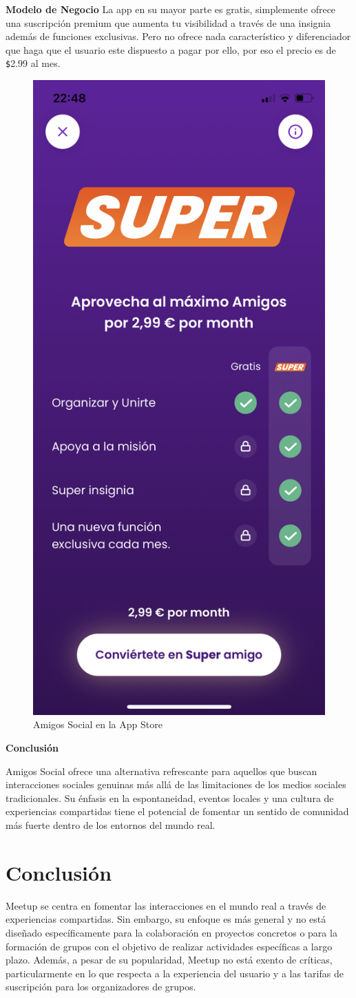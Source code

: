 \begin{itemize}
\textbf{Modelo de Negocio}
La app en su mayor parte es gratis, simplemente ofrece una suscripción premium que aumenta tu visibilidad a través de una insignia además de funciones exclusivas.
Pero no ofrece nada característico y diferenciador que haga que el usuario este dispuesto a pagar por ello, por eso el precio es de \verb|$|2.99 al mes.

\begin{figure}[H]
  \centering
  \includegraphics[cframe=black 2pt,width=0.3\linewidth]{images/estadodelarte/amigossocialsuper.jpeg}
  \caption{Amigos Social en la App Store}
  \label{fig:amigosocial_appstore}
\end{figure}

\textbf{Conclusión}

Amigos Social ofrece una alternativa refrescante para aquellos que buscan interacciones sociales genuinas más allá de las limitaciones de los medios sociales tradicionales. Su énfasis en la espontaneidad, eventos locales y una cultura de experiencias compartidas tiene el potencial de fomentar un sentido de comunidad más fuerte dentro de los entornos del mundo real.


\section{Conclusión}

Meetup se centra en fomentar las interacciones en el mundo real a 
través de experiencias compartidas. Sin embargo, su enfoque es más 
general y no está diseñado específicamente para la colaboración en 
proyectos concretos o para la formación de grupos con el objetivo de 
realizar actividades específicas a largo plazo. Además, a pesar de su 
popularidad, Meetup no está exento de críticas, particularmente en lo 
que respecta a la experiencia del usuario y a las tarifas de suscripción 
para los organizadores de grupos.


\end{itemize}
